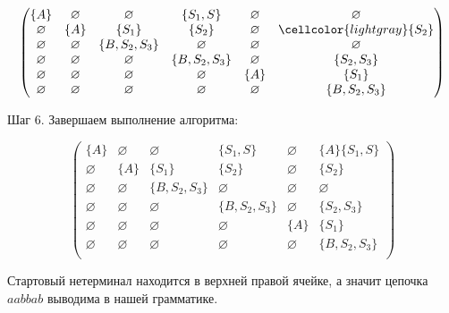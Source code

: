 \begin{example}
\[
\begin{pmatrix}
\{A\}       & \varnothing & \varnothing    & \{S_1, S\}       & \varnothing & \varnothing    \\
\varnothing & \{A\}       & \{S_1\}            & \{S_2\}          & \varnothing & \cellcolor{lightgray}\{S_2\}        \\
\varnothing & \varnothing & \{B, S_2, S_3\} & \varnothing     & \varnothing & \varnothing    \\
\varnothing & \varnothing & \varnothing    & \{B, S_2, S_3\}   & \varnothing & \{S_2, S_3\}  \\
\varnothing & \varnothing & \varnothing    & \varnothing      & \{A\}       & \{S_1\}            \\
\varnothing & \varnothing & \varnothing    & \varnothing      & \varnothing & \{B, S_2, S_3\} \\
\end{pmatrix}
\]

\bigbreak
Шаг 6. Завершаем выполнение алгоритма:

\[
\begin{pmatrix}
\{A\}       & \varnothing & \varnothing    & \{S_1, S\}       & \varnothing & \{A\}\{S_1, S\}     \\
\varnothing & \{A\}       & \{S_1\}            & \{S_2\}          & \varnothing & \{S_2\}        \\
\varnothing & \varnothing & \{B, S_2, S_3\} & \varnothing     & \varnothing & \varnothing    \\
\varnothing & \varnothing & \varnothing    & \{B, S_2, S_3\}   & \varnothing & \{S_2, S_3\}  \\
\varnothing & \varnothing & \varnothing    & \varnothing      & \{A\}       & \{S_1\}            \\
\varnothing & \varnothing & \varnothing    & \varnothing      & \varnothing & \{B, S_2, S_3\} \\
\end{pmatrix}
\]


Стартовый нетерминал находится в верхней правой ячейке, а значит цепочка $a a b b a b$ выводима в нашей грамматике.
\end{example}

